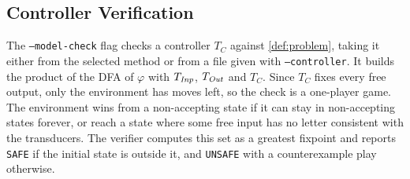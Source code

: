 \subsection{Controller Verification}\label{sec:verification}

The \texttt{--model-check} flag checks a controller $T_C$ against \cref{def:problem}, taking it either from the selected method or from a file given with \texttt{--controller}.
It builds the product of the DFA of $\varphi$ with $T_{\mathit{Inp}}$, $T_{\mathit{Out}}$ and $T_C$.
Since $T_C$ fixes every free output, only the environment has moves left, so the check is a one-player game.
The environment wins from a non-accepting state if it can stay in non-accepting states forever, or reach a state where some free input has no letter consistent with the transducers.
The verifier computes this set as a greatest fixpoint and reports \texttt{SAFE} if the initial state is outside it, and \texttt{UNSAFE} with a counterexample play otherwise.



